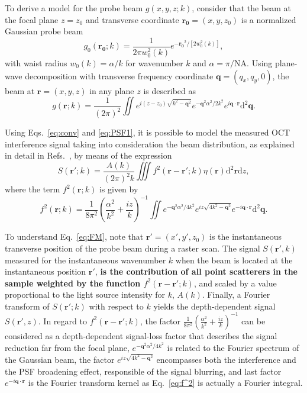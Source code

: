 To derive a model for the probe beam $g(x,y,z;k)$, consider that the beam at the focal plane $z=z_0$ and transverse coordinate $\mathbf{r_0} = (x,y,z_0)$ is a normalized Gaussian probe beam
\begin{equation}\label{}
    g_0(\mathbf{r_0}; k) = \frac{1}{2\pi w_0^2(k)}e^{-\mathbf{r_0}^2/[2w_0^2(k)]},
\end{equation}
with waist radius $w_0(k) = \alpha / k$ for wavenumber $k$ and $\alpha = \pi/\text{NA}$. Using plane-wave decomposition with transverse frequency coordinate $\mathbf{q} = (q_x, q_y, 0)$, the beam at $\mathbf{r} = (x, y, z)$ in any plane $z$ is described as~\cite{Ralston2006_Inverse}
\begin{equation}\label{}
    g(\mathbf{r}; k) = \frac{1}{(2\pi)^2} \iint e^{i(z-z_0)\sqrt{k^2 - \mathbf{q}^2}} e^{-\mathbf{q}^2\alpha^2/2k^2} e^{i\mathbf{q}\cdot\mathbf{r}} \text{d}^2\mathbf{q}.
\end{equation}

Using Eqs.~\ref{eq:conv} and \ref{eq:PSF1}, it is possible to model the measured OCT interference signal taking into consideration the beam distribution, as explained in detail in Refs.~\cite{Ralston2006_Inverse, Marks2006_Inverse}, by means of the expression
\begin{equation}\label{eq:FM}
    S(\mathbf{r'}; k) = \frac{A(k)}{(2\pi)^2 k} \iiint f^2(\mathbf{r}-\mathbf{r'}; k) \eta(\mathbf{r}) \text{d}^2\mathbf{r} \text{d}z,
\end{equation}
where the term $f^2(\mathbf{r}; k)$ is given by
\begin{equation}\label{eq:f^2}
    f^2(\mathbf{r}; k) = \frac{1}{8\pi^2}\left(\frac{\alpha^2}{k^2}+\frac{iz}{k}\right)^{-1} \iint e^{-\mathbf{q}^2\alpha^2/4k^2} e^{iz\sqrt{4k^2-\mathbf{q}^2}} e^{-i\mathbf{q}\cdot \mathbf{r}} \text{d}^2\mathbf{q}.
\end{equation}

To understand Eq.~\ref{eq:FM}, note that $\mathbf{r'}=(x',y',z_0)$ is the instantaneous transverse position of the probe beam during a raster scan. The signal $S(\mathbf{r'},k)$ measured for the instantaneous wavenumber $k$ when the beam is located at the instantaneous position $\mathbf{r'}$, \textbf{is the contribution of all point scatterers in the sample weighted by the function $f^2(\mathbf{r}-\mathbf{r'}; k)$}, and scaled by a value proportional to the light source intensity for $k$, $A(k)$. Finally, a Fourier transform of $S(\mathbf{r'}; k)$ with respect to $k$ yields the depth-dependent signal $S(\mathbf{r'}, z)$. In regard to $f^2(\mathbf{r}-\mathbf{r'}; k)$, the factor $\frac{1}{8\pi^2}\left(\frac{\alpha^2}{k^2}+\frac{iz}{k}\right)^{-1}$ can be considered as a depth-dependent signal-loss factor that describes the signal reduction far from the focal plane, $e^{-\mathbf{q}^2\alpha^2/4k^2}$ is related to the Fourier spectrum of the Gaussian beam, the factor $e^{iz\sqrt{4k^2-\mathbf{q}^2}}$ encompasses both the interference and the PSF broadening effect, responsible of the signal blurring, and last factor $e^{-i\mathbf{q}\cdot \mathbf{r}}$ is the Fourier transform kernel as Eq.~\ref{eq:f^2} is actually a Fourier integral.

